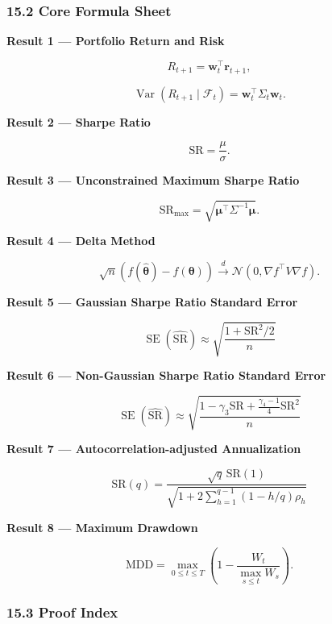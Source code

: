 \hypertarget{part-4-67-0001-core-formula-sheet}{%
\subsubsection{15.2 Core Formula Sheet}\label{part-4-67-0001-core-formula-sheet}}

\textbf{Result 1 --- Portfolio Return and Risk}

\[R_{t+1}
=
\boldsymbol w_t^\top\boldsymbol r_{t+1},\]

\[\operatorname{Var}(R_{t+1}\mid\mathcal F_t)
=
\boldsymbol w_t^\top\Sigma_t\boldsymbol w_t.\]

\textbf{Result 2 --- Sharpe Ratio}

\[\mathrm{SR}=\frac{\mu}{\sigma}.\]

\textbf{Result 3 --- Unconstrained Maximum Sharpe Ratio}

\[\mathrm{SR}_{\max}
=
\sqrt{\boldsymbol\mu^\top\Sigma^{-1}\boldsymbol\mu}.\]

\textbf{Result 4 --- Delta Method}

\[\sqrt n(f(\hat{\boldsymbol\theta})-f(\boldsymbol\theta))
\xrightarrow{d}
\mathcal N(0,\nabla f^\top V\nabla f).\]

\textbf{Result 5 --- Gaussian Sharpe Ratio Standard Error}

\[\boxed{
\operatorname{SE}(\widehat{\mathrm{SR}})
\approx
\sqrt{\frac{1+\mathrm{SR}^2/2}{n}}
}\]

\textbf{Result 6 --- Non-Gaussian Sharpe Ratio Standard Error}

\[\boxed{
\operatorname{SE}(\widehat{\mathrm{SR}})
\approx
\sqrt{
\frac{
1-\gamma_3\mathrm{SR}
+\frac{\gamma_4-1}{4}\mathrm{SR}^2
}{n}
}
}\]

\textbf{Result 7 --- Autocorrelation-adjusted Annualization}

\[\boxed{
\mathrm{SR}(q)
=
\frac{\sqrt q\,\mathrm{SR}(1)}
{\sqrt{
1+2\sum_{h=1}^{q-1}(1-h/q)\rho_h
}}
}\]

\textbf{Result 8 --- Maximum Drawdown}

\[\mathrm{MDD}
=
\max_{0\leq t\leq T}
\left(
1-\frac{W_t}{\max_{s\leq t}W_s}
\right).\]

\hypertarget{part-4-67-0001-proof-index}{%
\subsubsection{15.3 Proof Index}\label{part-4-67-0001-proof-index}}

